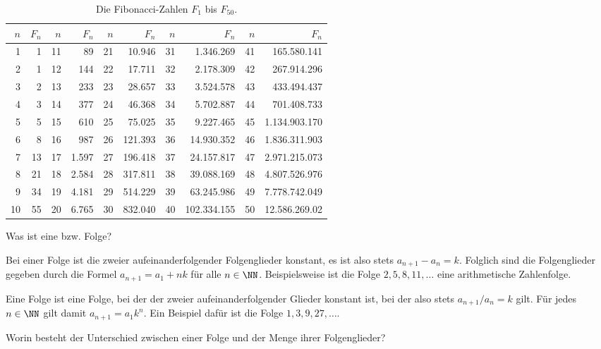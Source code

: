 \begin{table}
\begin{tabular}{r|r||r|r||r|r||r|r||r|r}
$n$&$F_n$&$n$&$F_n$&$n$&$F_n$&$n$&$F_n$&$n$&$F_n$\\\hline
1&1&11&89&21&10.946&31&1.346.269&41&165.580.141\\
2&1&12&144&22&17.711&32&2.178.309&42&267.914.296\\
3&2&13&233&23&28.657&33&3.524.578&43&433.494.437\\
4&3&14&377&24&46.368&34&5.702.887&44&701.408.733\\
5&5&15&610&25&75.025&35&9.227.465&45&1.134.903.170\\
6&8&16&987&26&121.393&36&14.930.352&46&1.836.311.903\\
7&13&17&1.597&27&196.418&37&24.157.817&47&2.971.215.073\\
8&21&18&2.584&28&317.811&38&39.088.169&48&4.807.526.976\\
9&34&19&4.181&29&514.229&39&63.245.986&49&7.778.742.049\\
10&55&20&6.765&30&832.040&40&102.334.155&50&12.586.269.02\\
\end{tabular}
\caption{Die Fibonacci-Zahlen $F_1$ bis $F_{50}$.}
\label{tab:fibo}
\end{table}


\begin{frage}%
  \label{02_fag}
  Was ist eine  bzw.  Folge?
\end{frage}

\begin{antwort}
  Bei einer  Folge ist die  
  zweier aufeinanderfolgender Folgenglieder konstant, 
  es ist also stets $a_{n+1}-a_n=k$. Folglich sind die Folgenglieder gegeben 
  durch die Formel $a_{n+1}= a_1 + n k$ für alle $n\in\NN$. 
  Beispielsweise ist die Folge $2,5,8,11,\ldots$ eine arithmetische 
  Zahlenfolge.

  Eine  Folge ist eine Folge, bei der der 
   zweier aufeinanderfolgender Glieder konstant ist, 
  bei der also stets $a_{n+1}/a_n=k$ gilt. Für jedes $n\in\NN$ gilt damit 
  $a_{n+1}=a_1 k^n$. Ein Beispiel dafür ist die  
  Folge $1,3,9,27,\ldots$. 
  \AntEnd
\end{antwort}

\begin{frage}%
  \label{02_fmgl}
  Worin besteht der Unterschied zwischen einer Folge und der Menge ihrer 
  Folgenglieder?
\end{frage}

